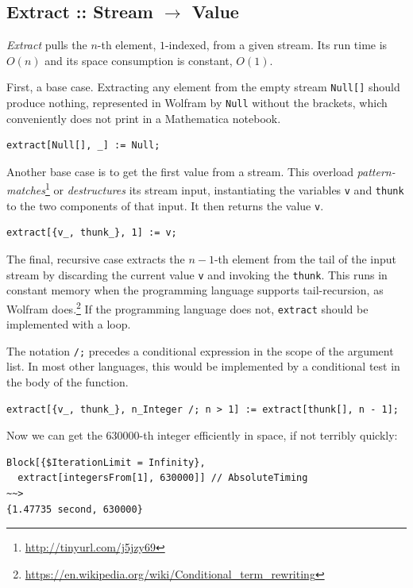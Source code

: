 \documentclass[10pt,oneside,x11names]{article}
\begin{document}
\subsection{Extract :: Stream \(\rightarrow\) Value}
\label{sec:orgheadline4}

\emph{Extract} pulls the \(n\)-th element, \(1\)-indexed, from a given stream. Its run
time is \(O(n)\) and its space consumption is constant, \(O(1)\).

First, a base case. Extracting any element from the empty stream \texttt{Null[]}
should produce nothing, represented in Wolfram by \texttt{Null} without the brackets,
which conveniently does not print in a Mathematica notebook.

\begin{verbatim}
extract[Null[], _] := Null;
\end{verbatim}

Another base case is to get the first value from a stream. This overload
\emph{pattern-matches}\footnote{\url{http://tinyurl.com/j5jzy69}} or \emph{destructures} its stream input, instantiating the
variables \texttt{v} and \texttt{thunk} to the two components of that input. It then returns
the value \texttt{v}.

\begin{verbatim}
extract[{v_, thunk_}, 1] := v;
\end{verbatim}

The final, recursive case extracts the \(n-1\)-th element from the tail of the
input stream by discarding the current value \texttt{v} and invoking the \texttt{thunk}. This
runs in constant memory when the programming language supports tail-recursion,
as Wolfram does.\footnote{\url{https://en.wikipedia.org/wiki/Conditional_term_rewriting}} If the programming language does not, \texttt{extract} should be
implemented with a loop.

The notation \texttt{/;} precedes a conditional expression in the scope of the argument
list. In most other languages, this would be implemented by a conditional test
in the body of the function.

\begin{verbatim}
extract[{v_, thunk_}, n_Integer /; n > 1] := extract[thunk[], n - 1];
\end{verbatim}

Now we can get the 630000-th integer efficiently in space, if not terribly quickly:

\begin{verbatim}
Block[{$IterationLimit = Infinity},
  extract[integersFrom[1], 630000]] // AbsoluteTiming
~~>
{1.47735 second, 630000}
\end{verbatim}
\end{document}
